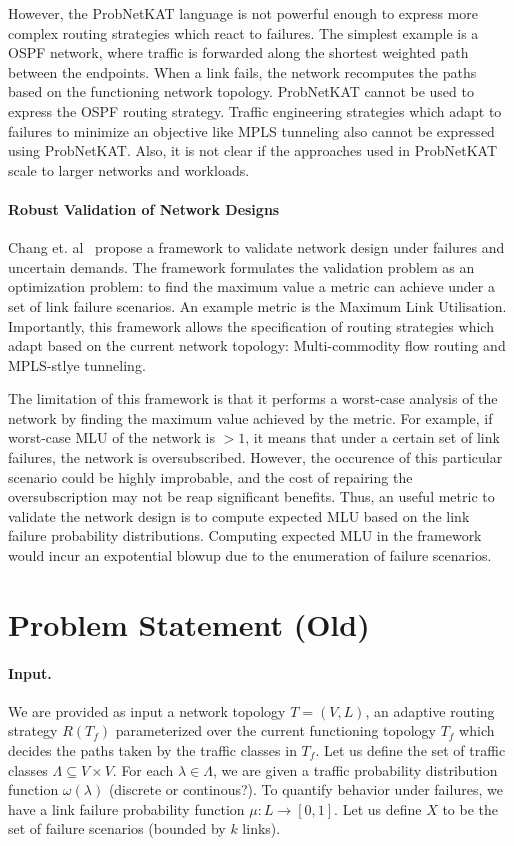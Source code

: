\documentclass[]{article}
\begin{document}
However, the ProbNetKAT language is not powerful enough to 
express more complex routing strategies which react to failures. 
The simplest example is a OSPF network, where traffic is 
forwarded along the shortest weighted path between the endpoints. 
When a link fails, the network recomputes the paths based on the 
functioning network topology. ProbNetKAT cannot be used to express
the OSPF routing strategy. Traffic engineering strategies which adapt 
to failures to minimize an objective like MPLS tunneling also 
cannot be expressed using ProbNetKAT. Also, it is not clear 
if the approaches used in ProbNetKAT scale to larger networks 
and workloads.

\paragraph{Robust Validation of Network Designs}
Chang et. al~\cite{robustvalidation} propose a framework 
to validate network design under failures and uncertain demands. 
The framework formulates the validation problem as an 
optimization problem: to find the maximum value a metric can
achieve under a set of link failure scenarios. An example 
metric is the Maximum Link Utilisation. Importantly,
this framework allows the specification of routing strategies
which adapt based on the current network topology: Multi-commodity
flow routing and MPLS-stlye tunneling. 

The limitation of this framework is that it performs a 
worst-case analysis of the network by finding the maximum value 
achieved by the metric. For example, if worst-case 
MLU of the network is $> 1$,
it means that under a certain set of link failures, the network is
oversubscribed. However, the occurence of this particular scenario
could be highly improbable, and the cost of repairing the 
oversubscription may not be reap significant benefits. 
Thus, an useful metric
to validate the network design is to 
compute expected MLU based on the 
link failure probability distributions. 
Computing expected 
MLU in the framework 
would incur an expotential blowup due to the
enumeration of failure scenarios.

\section{Problem Statement (Old)}
\paragraph{Input.} We are provided as input a 
network topology $T=(V,L)$, an adaptive 
routing strategy $R(T_f)$
parameterized over the current functioning topology $T_f$
which decides the paths taken by the traffic classes
in $T_f$. Let us define the 
set of traffic classes $\Lambda 
\subseteq V \times V$. For each $\lambda \in \Lambda$,
we are given a traffic probability 
distribution function 
$\omega(\lambda)$
(discrete or continous?). To quantify behavior under
failures, we have a link failure probability function
$\mu: L \rightarrow [0,1]$. Let us define $X$ to be 
the set of failure scenarios (bounded by $k$ links).
\end{document}
